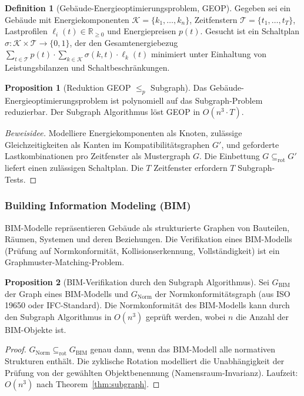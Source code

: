﻿\documentclass[a4paper,12pt]{article}
\theoremstyle{definition}
\newtheorem{definition}{Definition}[section]
\newtheorem{proposition}{Proposition}[section]
\begin{document}
\begin{definition}[Gebäude-Energieoptimierungsproblem, GEOP]
\label{def:geop}
Gegeben sei ein Gebäude mit Energiekomponenten $\mathcal{K} = \{k_1, \ldots, k_n\}$,
Zeitfenstern $\mathcal{T} = \{t_1, \ldots, t_T\}$, Lastprofilen
$\ell_i(t) \in \mathbb{R}_{\geq 0}$ und Energiepreisen $p(t)$.
Gesucht ist ein Schaltplan $\sigma: \mathcal{K} \times \mathcal{T} \to \{0,1\}$,
der den Gesamtenergiebezug $\sum_{t \in \mathcal{T}} p(t) \cdot \sum_{k \in \mathcal{K}} \sigma(k,t) \cdot \ell_k(t)$
minimiert unter Einhaltung von Leistungsbilanzen und Schaltbeschränkungen.
\end{definition}

\begin{proposition}[Reduktion GEOP $\leq_p$ Subgraph]
Das Gebäude-Energieoptimierungspro\-blem ist polynomiell auf das Subgraph-Problem
reduzierbar. Der Subgraph Algorithmus löst GEOP in $O(n^3 \cdot T)$.
\end{proposition}

\begin{proof}[Beweisidee]
Modelliere Energiekomponenten als Knoten, zulässige Gleichzeitigkeiten als Kanten
im Kompatibilitätsgraphen $G'$, und geforderte Lastkombinationen pro Zeitfenster
als Mustergraph $G$. Die Einbettung $G \subseteq_{\mathrm{rot}} G'$ liefert einen
zulässigen Schaltplan. Die $T$ Zeitfenster erfordern $T$ Subgraph-Tests.
\end{proof}

\subsubsection{Building Information Modeling (BIM)}

BIM-Modelle repräsentieren Gebäude als strukturierte Graphen von Bauteilen,
Räumen, Systemen und deren Beziehungen. Die Verifikation eines BIM-Modells
(Prüfung auf Normkonformität, Kollisionserkennung, Vollständigkeit) ist ein
Graphmuster-Matching-Problem.

\begin{proposition}[BIM-Verifikation durch den Subgraph Algorithmus]
\label{prop:bim}
Sei $G_{\mathrm{BIM}}$ der Graph eines BIM-Modells und $G_{\mathrm{Norm}}$
der Normkonformitätsgraph (aus ISO 19650 oder IFC-Standard).
Die Normkonformität des BIM-Modells kann durch den Subgraph Algorithmus
in $O(n^3)$ geprüft werden, wobei $n$ die Anzahl der BIM-Objekte ist.
\end{proposition}

\begin{proof}
$G_{\mathrm{Norm}} \subseteq_{\mathrm{rot}} G_{\mathrm{BIM}}$ genau dann,
wenn das BIM-Modell alle normativen Strukturen enthält.
Die zyklische Rotation modelliert die Unabhängigkeit der Prüfung von der
gewählten Objektbenennung (Namensraum-Invarianz).
Laufzeit: $O(n^3)$ nach Theorem~\ref{thm:subgraph}.
\end{proof}
\end{document}
